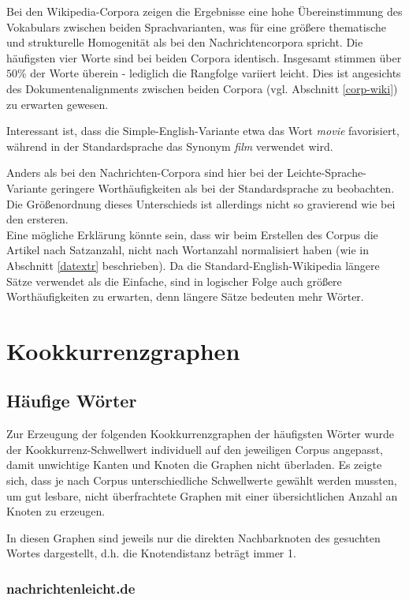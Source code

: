 \documentclass[11pt, a4paper]{article}
\begin{document}
Bei den Wikipedia-Corpora zeigen die Ergebnisse eine hohe Übereinstimmung des
Vokabulars zwischen beiden Sprachvarianten, was für eine größere thematische
und strukturelle Homogenität als bei den Nachrichtencorpora spricht.
Die häufigsten vier Worte sind bei beiden Corpora identisch.
Insgesamt stimmen über $50\%$ der Worte überein - lediglich die Rangfolge
variiert leicht.
Dies ist angesichts des Dokumentenalignments zwischen beiden Corpora (vgl.
Abschnitt \ref{corp-wiki}) zu erwarten gewesen.

Interessant ist, dass die Simple-English-Variante etwa das Wort \textit{movie}
favorisiert, während in der Standardsprache das Synonym \textit{film} verwendet
wird.

Anders als bei den Nachrichten-Corpora sind hier bei der Leichte-Sprache-Variante
geringere Worthäufigkeiten als bei der Standardsprache zu beobachten.
Die Größenordnung dieses Unterschieds ist allerdings nicht so gravierend wie bei
den ersteren.\\
Eine mögliche Erklärung könnte sein, dass wir beim Erstellen des Corpus die
Artikel nach Satzanzahl, nicht nach Wortanzahl normalisiert haben (wie in
Abschnitt \ref{datextr} beschrieben).
Da die Standard-English-Wikipedia längere Sätze verwendet als die Einfache,
sind in logischer Folge auch größere Worthäufigkeiten zu erwarten, denn längere
Sätze bedeuten mehr Wörter.



\section{Kookkurrenzgraphen}
\label{sec:graphen}

\subsection{Häufige Wörter}

Zur Erzeugung der folgenden Kookkurrenzgraphen der häufigsten Wörter
wurde der Kookkurrenz-Schwellwert individuell auf den jeweiligen Corpus
angepasst, damit unwichtige Kanten und Knoten die Graphen nicht überladen.
Es zeigte sich, dass je nach Corpus unterschiedliche Schwellwerte gewählt werden
mussten, um gut lesbare, nicht überfrachtete Graphen mit einer übersichtlichen
Anzahl an Knoten zu erzeugen.

In diesen Graphen sind jeweils nur die direkten Nachbarknoten des gesuchten
Wortes dargestellt, d.h. die Knotendistanz beträgt immer 1.

\subsubsection{nachrichtenleicht.de}
\end{document}
